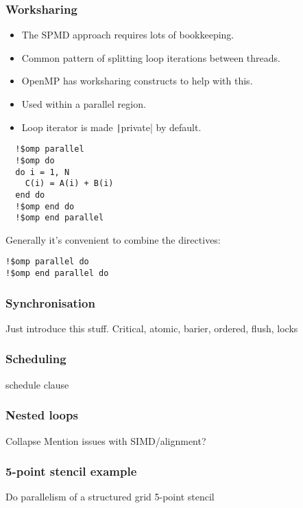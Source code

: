 \documentclass{beamer}
\begin{document}
\begin{frame}[fragile]
\frametitle{Worksharing}

\begin{itemize}
\item The SPMD approach requires lots of bookkeeping.
\item Common pattern of splitting loop iterations between threads.
\item OpenMP has worksharing constructs to help with this.
\item Used within a parallel region.
\item Loop iterator is made \texttt|private| by default.
\end{itemize}

\begin{verbatim}
  !$omp parallel
  !$omp do
  do i = 1, N
    C(i) = A(i) + B(i)
  end do
  !$omp end do
  !$omp end parallel
\end{verbatim}


Generally it's convenient to combine the directives:
\begin{verbatim}
!$omp parallel do
!$omp end parallel do
\end{verbatim}

\end{frame}

\begin{frame}
\frametitle{Synchronisation}
Just introduce this stuff.
Critical, atomic, barier, ordered, flush, locks
\end{frame}

\begin{frame}
\frametitle{Scheduling}
schedule clause

\end{frame}

\begin{frame}
\frametitle{Nested loops}
Collapse
Mention issues with SIMD/alignment?

\end{frame}

\begin{frame}
\frametitle{5-point stencil example}
Do parallelism of a structured grid 5-point stencil
\end{frame}
\end{document}
